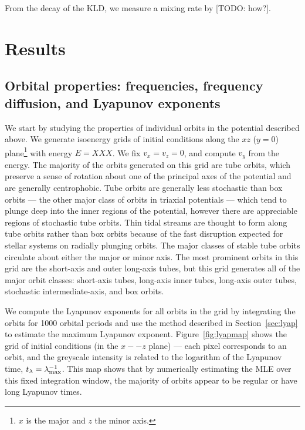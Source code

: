 \documentclass[letterpaper,12pt,preprint]{aastex}
\begin{document}
From the decay of the KLD, we measure a mixing rate by [TODO: how?].

\section{Results}\label{sec:results}

\subsection{Orbital properties: frequencies, frequency diffusion, and Lyapunov exponents}

We start by studying the properties of individual orbits in the potential described above. We generate isoenergy grids of initial conditions along the $xz$ ($y=0$) plane\footnote{$x$ is the major and $z$ the minor axis.} with energy $E=XXX$. We fix $v_x = v_z = 0$, and compute $v_y$ from the energy. The majority of the orbits generated on this grid are tube orbits, which preserve a sense of rotation about one of the principal axes of the potential and are generally centrophobic. Tube orbits are generally less stochastic than box orbits --- the other major class of orbits in triaxial potentials --- which tend to plunge deep into the inner regions of the potential, however there are appreciable regions of stochastic tube orbits. Thin tidal streams are thought to form along tube orbits rather than box orbits because of the fast disruption expected for stellar systems on radially plunging orbits. The major classes of stable tube orbits circulate about either the major or minor axis. The most prominent orbits in this grid are the short-axis and outer long-axis tubes, but this grid generates all of the major orbit classes: short-axis tubes, long-axis inner tubes, long-axis outer tubes, stochastic intermediate-axis, and box orbits. 

We compute the Lyapunov exponents for all orbits in the grid by integrating the orbits for 1000 orbital periods and use the method described in Section~\ref{sec:lyap} to estimate the maximum Lyapunov exponent. Figure~\ref{fig:lyapmap} shows the grid of initial conditions (in the $x--z$ plane) --- each pixel corresponds to an orbit, and the greyscale intensity is related to the logarithm of the Lyapunov time, $t_\lambda = \lambda_{\rm max}^{-1}$. This map shows that by numerically estimating the MLE over this fixed integration window, the majority of orbits appear to be regular or have long Lyapunov times.

\end{document}

